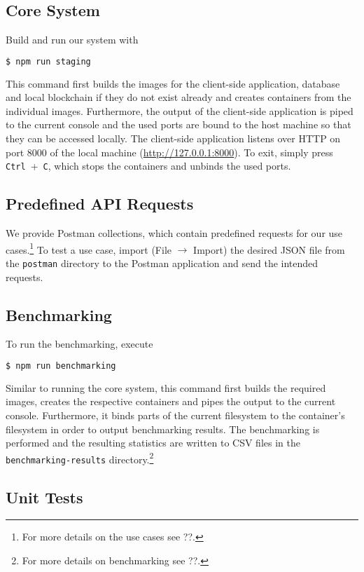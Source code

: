 \subsection*{Core System}

Build and run our system with
\begin{lstlisting}[language=bash]
$ npm run staging 
\end{lstlisting}
This command first builds the images for the client-side application, database and local blockchain if they do not exist already and creates containers from the individual images. Furthermore, the output of the client-side application is piped to the current console and the used ports are bound to the host machine so that they can be accessed locally. The client-side application listens over HTTP on port 8000 of the local machine (\url{http://127.0.0.1:8000}). To exit, simply press \mbox{\texttt{Ctrl} + \texttt{C}}, which stops the containers and unbinds the used ports.

\subsection*{Predefined API Requests}

We provide Postman collections, which contain predefined requests for our use cases.\footnote{For more details on the use cases see ??.} To test a use case, import (File $\rightarrow$ Import) the desired JSON file from the \texttt{postman} directory to the Postman application and send the intended requests.
	
\subsection*{Benchmarking}

To run the benchmarking, execute
\begin{lstlisting}[language=bash]
$ npm run benchmarking
\end{lstlisting}
Similar to running the core system, this command first builds the required images, creates the respective containers and pipes the output to the current console. Furthermore, it binds parts of the current filesystem to the container's filesystem in order to output benchmarking results. The benchmarking is performed and the resulting statistics are written to CSV files in the \texttt{benchmarking-results} directory.\footnote{For more details on benchmarking see ??.}

\subsection*{Unit Tests}

